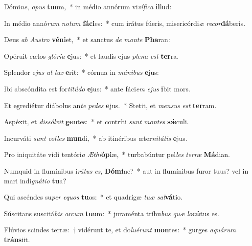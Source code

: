\item Dómi\textit{ne}, \textit{o}\textit{pus} \textbf{tu}um,~* in médio annórum vi\textit{ví}\textit{fi}\textit{ca} \textbf{il}lud:
\item In médio annó\textit{rum} \textit{no}\textit{tum} \textbf{fá}\textbf{ci}es:~* cum irátus fúeris, misericórdi\textit{æ} \textit{re}\textit{cor}\textbf{dá}beris.
\item Deus \textit{ab} \textit{Aus}\textit{tro} \textbf{vé}\textbf{ni}et,~* et sanctus \textit{de} \textit{mon}\textit{te} \textbf{Pha}ran:
\item Opéruit cælos \textit{gló}\textit{ri}\textit{a} \textbf{e}jus:~* et laudis ejus \textit{ple}\textit{na} \textit{est} \textbf{ter}ra.
\item Splendor e\textit{jus} \textit{ut} \textit{lux} \textbf{e}rit:~* córnua in \textit{má}\textit{ni}\textit{bus} \textbf{e}jus:
\item Ibi abscóndita est for\textit{ti}\textit{tú}\textit{do} \textbf{e}jus:~* ante fáci\textit{em} \textit{e}\textit{jus} \textbf{i}bit mors.
\item Et egrediétur diábolus an\textit{te} \textit{pe}\textit{des} \textbf{e}jus.~* Stetit, et \textit{men}\textit{sus} \textit{est} \textbf{ter}ram.
\item Aspéxit, et \textit{dis}\textit{sól}\textit{vit} \textbf{gen}tes:~* et contríti \textit{sunt} \textit{mon}\textit{tes} \textbf{sǽ}culi.
\item Incurváti \textit{sunt} \textit{col}\textit{les} \textbf{mun}di,~* ab itinéribus æter\textit{ni}\textit{tá}\textit{tis} \textbf{e}jus.
\item Pro iniquitáte vidi tentóri\textit{a} \textit{Æ}\textit{thi}\textbf{ó}\textbf{pi}æ,~* turbabúntur pel\textit{les} \textit{ter}\textit{ræ} \textbf{Má}dian.
\item Numquid in flumínibus i\textit{rá}\textit{tus} \textit{es}, \textbf{Dó}\textbf{mi}ne?~* aut in flumínibus furor tuus? vel in mari indi\textit{gná}\textit{ti}\textit{o} \textbf{tu}a?
\item Qui ascéndes su\textit{per} \textit{e}\textit{quos} \textbf{tu}os:~* et quadrígæ \textit{tu}\textit{æ} \textit{sal}\textbf{vá}tio.
\item Súscitans suscitá\textit{bis} \textit{ar}\textit{cum} \textbf{tu}um:~* juraménta tríbu\textit{bus} \textit{quæ} \textit{lo}\textbf{cú}tus es.
\item Flúvios scindes terræ:~† vidérunt te, et do\textit{lu}\textit{é}\textit{runt} \textbf{mon}tes:~* gurges \textit{a}\textit{quá}\textit{rum} \textbf{tráns}iit.
